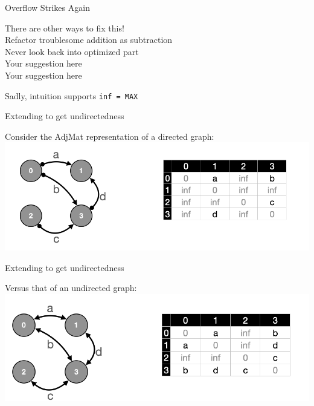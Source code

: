 \documentclass[usenames, xcolor=dvipsnames]{beamer}
\begin{document}
\begin{frame}{Overflow Strikes Again}

There are other ways to fix this!
\\ \pause \hspace{1em} Refactor troublesome addition as subtraction
\\ \pause \hspace{1em} Never look back into optimized part
\\ \pause \hspace{1em} Your suggestion here
\\ \pause \hspace{1em} Your suggestion here

\bigskip

\pause Sadly, intuition supports \texttt{inf = MAX}

\end{frame}


\begin{frame}{Extending to get undirectedness}

Consider the AdjMat representation of a directed graph: \\
\includegraphics[scale=0.7]{directed}

\end{frame}

\begin{frame}{Extending to get undirectedness}

Versus that of an undirected graph: \\
\includegraphics[scale=0.7]{undirected}

\end{frame}
\end{document}
